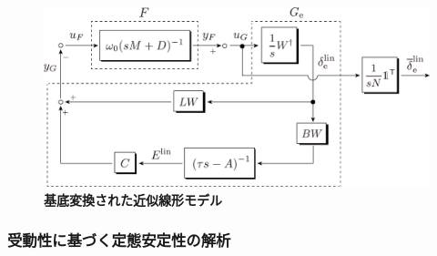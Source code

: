 \documentclass[tombow,dvipdfmx]{corona-a5-1.1}
\begin{document}
\begin{figure}[t]
\centering
\includegraphics[width = .90\linewidth]{figs/FandGe2}
\medskip
\caption{\textbf{基底変換された近似線形モデル}}
\label{fig:GandGe}
\medskip
\end{figure}


\subsubsection{受動性に基づく定態安定性の解析}
\end{document}
